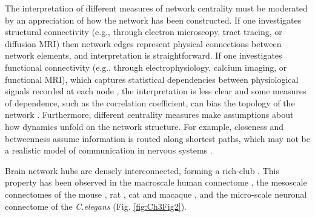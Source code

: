 The interpretation of different measures of network centrality must be moderated by an appreciation of how the network has been constructed. If one investigates structural connectivity (e.g., through electron microscopy, tract tracing, or diffusion MRI) then network edges represent physical connections between network elements, and interpretation is straightforward. If one investigates functional connectivity (e.g., through electrophysiology, calcium imaging, or functional MRI), which captures statistical dependencies between physiological signals recorded at each node \citep{Friston1994}, the interpretation is less clear and some measures of dependence, such as the correlation coefficient, can bias the topology of the network \citep{Power2011,Zalesky2012}. Furthermore, different centrality measures make assumptions about how dynamics unfold on the network structure. For example, closeness and betweenness assume information is routed along shortest paths, which may not be a realistic model of communication in nervous systems \citep{Goni2014,Misic2015a,Seguin2018}. 

Brain network hubs are densely interconnected, forming a rich-club \citep{Colizza2006}. This property has been observed in the macroscale human connectome \citep{VandenHeuvel2011}, the mesoscale connectomes of the mouse \citep{Fulcher2016}, rat \citep{VandenHeuvel2016b}, cat \citep{DeReus2013b} and macaque \citep{Harriger2012}, and the micro-scale neuronal connectome of the \textit{C.elegans} \citep{Towlson2013} (Fig. \ref{fig:Ch3Fig2}).


